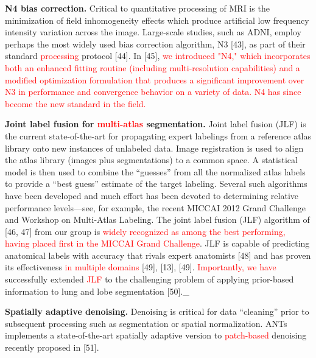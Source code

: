 \documentclass[11pt,]{article}
\begin{document}
\textbf{N4 bias correction.} Critical to quantitative processing of MRI
is the minimization of field inhomogeneity effects which produce
artificial low frequency intensity variation across the image.
Large-scale studies, such as ADNI, employ perhaps the most widely used
bias correction algorithm, N3 {[}43{]}, as part of their standard
\textcolor{red}{processing} protocol {[}44{]}. In {[}45{]},
\textcolor{red}{we introduced "N4," which incorporates both an enhanced fitting
routine (including multi-resolution capabilities) and a modified optimization
formulation that produces a significant improvement over N3 in performance and
convergence behavior on a variety of data.  N4 has since become the new standard in the
field.}

\textbf{Joint label fusion for \textcolor{red}{multi-atlas}
segmentation.} Joint label fusion (JLF) is the current state-of-the-art
for propagating expert labelings from a reference atlas library onto new
instances of unlabeled data. Image registration is used to align the
atlas library (images plus segmentations) to a common space. A
statistical model is then used to combine the ``guesses'' from all the
normalized atlas labels to provide a ``best guess'' estimate of the
target labeling. Several such algorithms have been developed and much
effort has been devoted to determining relative performance
levels---see, for example, the recent MICCAI 2012 Grand Challenge and
Workshop on Multi-Atlas Labeling. The joint label fusion (JLF) algorithm
of {[}46, 47{]} from our group is
\textcolor{red}{widely recognized as among the best performing, having placed
first in the MICCAI Grand Challenge}. JLF is capable of predicting
anatomical labels with accuracy that rivals expert anatomists {[}48{]}
and has proven its effectiveness \textcolor{red}{in multiple domains}
{[}49{]}, {[}13{]}, {[}49{]}. \textcolor{red}{Importantly, we have}
successfully extended \textcolor{red}{JLF} to the challenging problem of
applying prior-based information to lung and lobe segmentation
{[}50{]}.\_

\textbf{Spatially adaptive denoising.} Denoising is critical for data
``cleaning'' prior to subsequent processing such as segmentation or
spatial normalization. ANTs implements a state-of-the-art spatially
adaptive version to \textcolor{red}{patch-based} denoising recently
proposed in {[}51{]}.
\end{document}
